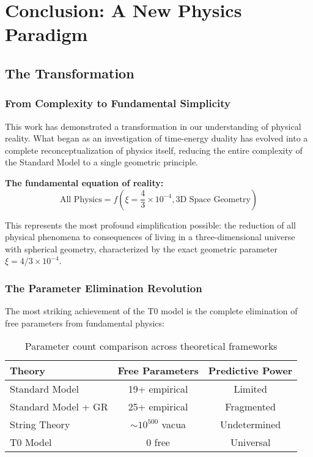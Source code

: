 \documentclass[12pt,a4paper]{report}
\begin{document}
\chapter{Conclusion: A New Physics Paradigm}
\label{chap:conclusion}

\section{The Transformation}
\label{sec:revolutionary_transformation}

\subsection{From Complexity to Fundamental Simplicity}
\label{subsec:complexity_to_simplicity}

This work has demonstrated a transformation in our understanding of physical reality. What began as an investigation of time-energy duality has evolved into a complete reconceptualization of physics itself, reducing the entire complexity of the Standard Model to a single geometric principle.

\textbf{The fundamental equation of reality:}
\begin{equation}
	\boxed{\text{All Physics} = f\left(\xi = \frac{4}{3} \times 10^{-4}, \text{3D Space Geometry}\right)}
\end{equation}

This represents the most profound simplification possible: the reduction of all physical phenomena to consequences of living in a three-dimensional universe with spherical geometry, characterized by the exact geometric parameter $\xi = 4/3 \times 10^{-4}$.

\subsection{The Parameter Elimination Revolution}
\label{subsec:parameter_elimination}

The most striking achievement of the T0 model is the complete elimination of free parameters from fundamental physics:

\begin{table}[htbp]
	\centering
	\begin{tabular}{lcc}
		\toprule
		\textbf{Theory} & \textbf{Free Parameters} & \textbf{Predictive Power} \\
		\midrule
		Standard Model & 19+ empirical & Limited \\
		Standard Model + GR & 25+ empirical & Fragmented \\
		String Theory & $\sim 10^{500}$ vacua & Undetermined \\
		T0 Model & 0 free & Universal \\
		\bottomrule
	\end{tabular}
	\caption{Parameter count comparison across theoretical frameworks}
	\label{tab:parameter_comparison}
\end{table}
\end{document}
